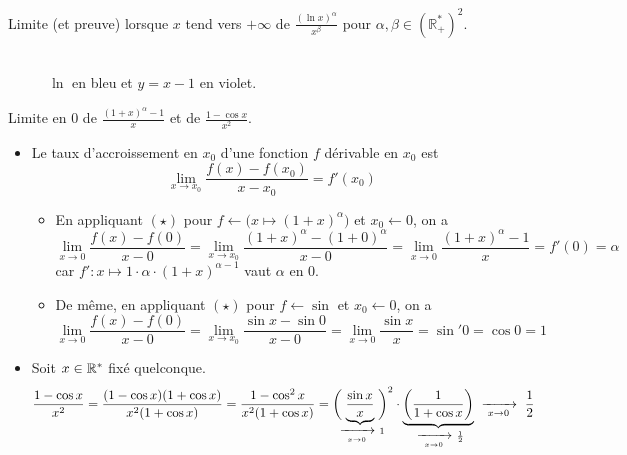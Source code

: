 \documentclass{article}
\renewenvironment{question_kholle}[2][ ]
{
	\subsection{\texorpdfstring{#2}{}}
	\notblank{#1}
	{
		\noindent #1
		\bigbreak
	}
	{}
	\begin{proof}
}
{
	\end{proof}
}
\begin{document}
\begin{question_kholle}{Limite (et preuve) lorsque $x$ tend vers $+\infty$ de $\displaystyle\frac{(\ln x)^{\alpha}}{x^{\beta}}$ pour $\alpha ,\beta \in \left( \mathbb{R}_+^*\right) ^2$.}
\begin{minipage}{0.7\textwidth}
\begin{align*}
    \end{align*}
  \end{minipage}
  \begin{minipage}{0.3\textwidth}
    \begin{figure}[H]
      \centering
      \caption{$\ln$ en bleu et $y=x-1$ en violet.}
    \end{figure}
  \end{minipage}
\end{question_kholle}

\begin{question_kholle}{Limite en $0$ de $\displaystyle\frac{(1+x)^{\alpha}-1}{x}$ et de $\displaystyle\frac{1-\cos x}{x^2}$.}
  \hfill
  \begin{itemize}[label=$*$]
    \item Le taux d'accroissement en $x_0$ d'une fonction $f$ dérivable en $x_0$ est
          \[\tag{$\star$}
            \lim_{x\to x_0}\frac{f(x)-f(x_0)}{x-x_0}=f'(x_0)
          \]
          \begin{itemize}
            \item En appliquant $(\star)$ pour $f\leftarrow \bigl(x\mapsto (1+x)^{\alpha}\bigr)$ et $x_0\leftarrow 0$, on a
                  \[
                    \lim_{x\to 0}\frac{f(x)-f(0)}{x-0}=\lim_{x\to x_0}\frac{(1+x)^{\alpha}-(1+0)^{\alpha}}{x-0} = \lim_{x\to 0}\frac{(1+x)^{\alpha}-1}{x}=f'(0)=\alpha
                  \]
                  car $f': x\mapsto 1\cdot \alpha\cdot (1+x)^{\alpha - 1}$ vaut $\alpha$ en $0$.
            \item De même, en appliquant $(\star)$ pour $f\leftarrow \sin$ et $x_0\leftarrow 0$, on a
                  \[
                    \lim_{x\to 0}\frac{f(x)-f(0)}{x-0}=\lim_{x\to x_0}\frac{\sin x-\sin 0}{x-0} = \lim_{x\to 0}\frac{\sin x}{x}=\sin' 0=\cos 0=1
                  \]
          \end{itemize}
    \item Soit $x\in\mathbb R^*$ fixé quelconque.
          \[
            \frac{1 - \cos x}{x^2} = \frac{(1-\cos x)(1+\cos x)}{x^2(1+\cos x)} = \frac{1-\cos^2 x}{x^2(1+\cos x)}=\biggl(\!\!\!\smash{\underbrace{\frac{\sin x}{x}}_{\ \xrightarrow[\;x \to 0\;]{}\ 1}}\!\!\!\biggr)^2\cdot\underbrace{\left(\frac{1}{1+\cos x}\right)}_{\ \xrightarrow[\;x \to 0\;]{}\ \frac{1}{2}} \ \xrightarrow[\;x \to 0\;]{}\ \frac{1}{2}
          \]
  \end{itemize}
\end{question_kholle}
\end{document}
